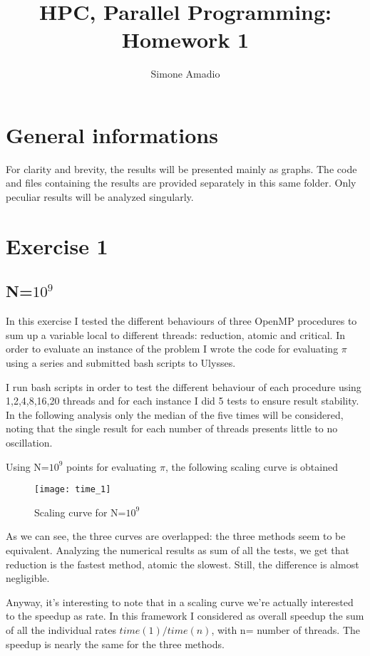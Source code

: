 \documentclass[10pt,a4paper]{article}
\begin{document}
\author{Simone Amadio}
\title{HPC, Parallel Programming:\\Homework 1}
\date{}
\maketitle

\section*{General informations}

For clarity and brevity, the results will be presented mainly as graphs. The code and files containing the results are provided separately in this same folder. Only peculiar results will be analyzed singularly.

\section{Exercise 1}
\subsection{N=$10^{9}$}
In this exercise I tested the different behaviours of three OpenMP procedures to sum up a variable local to different threads: reduction, atomic and critical. In order to evaluate an instance of the problem I wrote the code for evaluating $\pi$ using a series and submitted bash scripts to Ulysses.

I run bash scripts in order to test the different behaviour of each procedure using 1,2,4,8,16,20 threads and for each instance I did 5 tests to ensure result stability. In the following analysis only the median of the five times will be considered, noting that the single result for each number of threads presents little to no oscillation.

Using N=$10^9$ points for evaluating $\pi$, the following scaling curve is obtained

\begin{figure}[h!]
	\centering
	\texttt{[image: time\_1]}
	\caption*{Scaling curve for N=$10^9$}
	\label{fig:time1}
\end{figure}

As we can see, the three curves are overlapped: the three methods seem to be equivalent. Analyzing the numerical results as sum of all the tests, we get that reduction is the fastest method, atomic the slowest. Still, the difference is almost negligible.

Anyway, it's interesting to note that in a scaling curve we're actually interested to the speedup as rate. In this framework I considered as overall speedup the sum of all the individual rates $time (1)/time(n)$, with n= number of threads. The speedup is nearly the same for the three methods.
\end{document}
